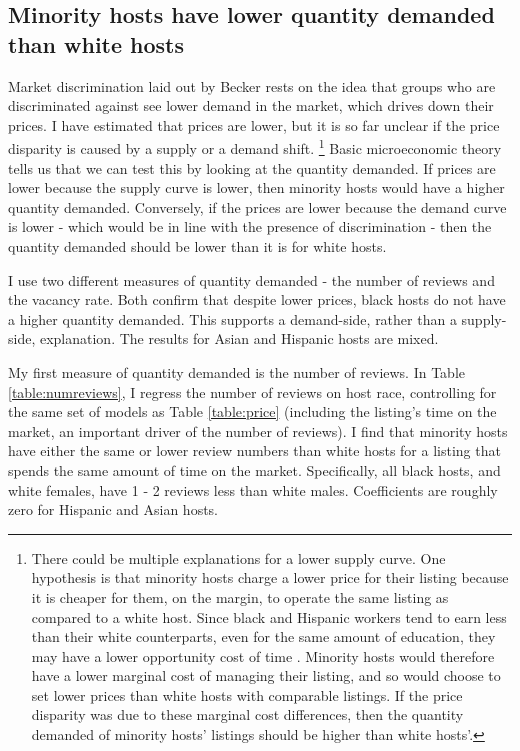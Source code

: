 \subsection{Minority hosts have lower quantity demanded than white hosts}
	\label{result2}
Market discrimination laid out by Becker rests on the idea that groups who are discriminated against see lower demand in the market, which drives down their prices. I have estimated that prices are lower, but it is so far unclear if the price disparity is caused by a supply or a demand shift.%
	\footnote{There could be multiple explanations for a lower supply curve. One hypothesis is that minority hosts charge a lower price for their listing because it is cheaper for them, on the margin, to operate the same listing as compared to a white host. Since black and Hispanic workers tend to earn less than their white counterparts, even for the same amount of education, they may have a lower opportunity cost of time \citep{wages}. Minority hosts would therefore have a lower marginal cost of managing their listing, and so would choose to set lower prices than white hosts with comparable listings. If the price disparity was due to these marginal cost differences, then the quantity demanded of minority hosts' listings should be higher than white hosts'.}
Basic microeconomic theory tells us that we can test this by looking at the quantity demanded. If prices are lower because the supply curve is lower, then minority hosts would have a higher quantity demanded. Conversely, if the prices are lower because the demand curve is lower - which would be in line with the presence of discrimination - then the quantity demanded should be lower than it is for white hosts. 
 
I use two different measures of quantity demanded - the number of reviews and the vacancy rate. Both confirm that despite lower prices, black hosts do not have a higher quantity demanded. This supports a demand-side, rather than a supply-side, explanation. The results for Asian and Hispanic hosts are mixed. 

My first measure of quantity demanded is the number of reviews. In Table \ref{table:numreviews}, I regress the number of reviews on host race, controlling for the same set of models as Table \ref{table:price} (including the listing's time on the market, an important driver of the number of reviews). I find that minority hosts have either the same or lower review numbers than white hosts for a listing that spends the same amount of time on the market. Specifically, all black hosts, and white females, have 1 - 2 reviews less than white males. Coefficients are roughly zero for Hispanic and Asian hosts. 

